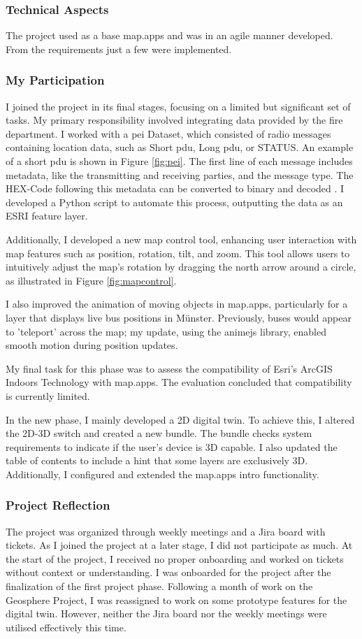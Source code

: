 \documentclass[11pt, titlepage, a4paper]{article}
\begin{document}
\subsubsection{Technical Aspects}
The project used as a base map.apps and was in an agile manner developed. From the requirements just a few were implemented.

\subsubsection{My Participation}
I joined the project in its final stages, focusing on a limited but significant set of tasks. My primary responsibility involved integrating data provided by the fire department. I worked with a \gls{pei} Dataset, which consisted of radio messages containing location data, such as Short \gls{pdu}, Long \gls{pdu}, or STATUS. An example of a short \gls{pdu} is shown in Figure \ref{fig:pei}. The first line of each message includes metadata, like the transmitting and receiving parties, and the message type. The HEX-Code following this metadata can be converted to binary and decoded \cite{etsiETSITS1002007}. I developed a Python script to automate this process, outputting the data as an ESRI feature layer.

Additionally, I developed a new map control tool, enhancing user interaction with map features such as position, rotation, tilt, and zoom. This tool allows users to intuitively adjust the map's rotation by dragging the north arrow around a circle, as illustrated in Figure \ref{fig:mapcontrol}.


I also improved the animation of moving objects in map.apps, particularly for a layer that displays live bus positions in Münster. Previously, buses would appear to 'teleport' across the map; my update, using the animejs library, enabled smooth motion during position updates.

My final task for this phase was to assess the compatibility of Esri's ArcGIS Indoors Technology with map.apps. The evaluation concluded that compatibility is currently limited.

In the new phase, I mainly developed a 2D digital twin. To achieve this, I altered the 2D-3D switch and created a new bundle. The bundle checks system requirements to indicate if the user's device is 3D capable. I also updated the table of contents to include a hint that some layers are exclusively 3D. 
Additionally, I configured and extended the map.apps intro functionality.
\subsubsection{Project Reflection}
The project was organized through weekly meetings and a Jira board with tickets. As I joined the project at a later stage, I did not participate as much. At the start of the project, I received no proper onboarding and worked on tickets without context or understanding. I was onboarded for the project after the finalization of the first project phase. Following a month of work on the Geosphere Project, I was reassigned to work on some prototype features for the digital twin. However, neither the Jira board nor the weekly meetings were utilised effectively this time.
\end{document}
